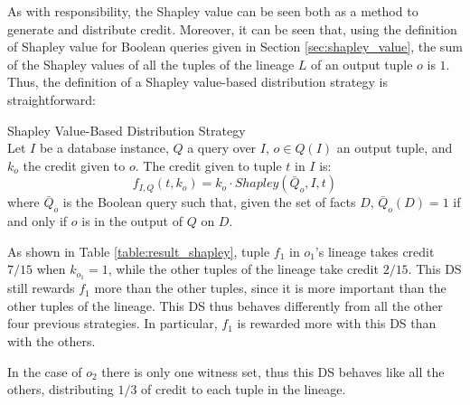 
As with responsibility, the Shapley value can be seen both as a method to generate and distribute credit. Moreover, it can be seen that, using the definition of Shapley value for Boolean queries given in Section \ref{sec:shapley_value}, the sum of the Shapley values of all the tuples of the lineage $L$ of an output tuple $o$ is $1$. Thus, the definition of a Shapley value-based distribution strategy is straightforward:

\begin{definition}{Shapley Value-Based Distribution Strategy} \\
	Let $I$ be a database instance, $Q$ a query over $I$, $o \in Q(I)$ an output tuple, and $k_o$ the credit given to $o$. The credit given to tuple $t$ in $I$ is:
	\[
		f_{I, Q}(t, k_o) = k_o \cdot 
		Shapley(\bar{Q}_o, I, t)
	\] 
	where $\bar{Q}_o$ is the Boolean query such that, given the set of facts $D$, $\bar{Q}_o(D) = 1$ if and only if $o$ is in the output of $Q$ on $D$.
\end{definition}

As shown in Table \ref{table:result_shapley}, tuple $f_1$ in $o_1$'s lineage takes credit $7/15$ when $k_{o_1} = 1$, while the other tuples of the lineage take credit $2/15$. This DS still rewards $f_1$ more than the other tuples, since it is more important than the other tuples of the lineage. This DS thus behaves differently from all the other four previous strategies. In particular, $f_1$ is rewarded more with this DS than with the others.

In the case of $o_2$ there is only one witness set, thus this DS behaves like all the others, distributing $1/3$ of credit to each tuple in the lineage. 








